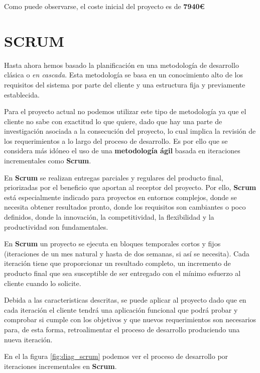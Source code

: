\bigskip
Como puede observarse, el coste inicial del proyecto es de \textbf{7940\euro}

\section{SCRUM}

Hasta ahora hemos basado la planificación en una metodología de desarrollo clásica o \textit{en cascada}. Esta metodología se basa en un conocimiento alto de los requisitos del sistema por parte del cliente y una estructura fija y previamente establecida. 

\bigskip
Para el proyecto actual no podemos utilizar este tipo de metodología ya que el cliente no sabe con exactitud lo que quiere, dado que hay una parte de investigación asociada a la consecución del proyecto, lo cual implica la revisión de los requerimientos a lo largo del proceso de desarrollo. Es por ello que se considera más idóneo el uso de una \textbf{metodología ágil} basada en iteraciones incrementales como \textbf{Scrum}.

\bigskip
En \textbf{Scrum} se realizan entregas parciales y regulares del producto final, priorizadas por el beneficio que aportan al receptor del proyecto. Por ello, \textbf{Scrum} está especialmente indicado para proyectos en entornos complejos, donde se necesita obtener resultados pronto, donde los requisitos son cambiantes o poco definidos, donde la innovación, la competitividad, la flexibilidad y la productividad son fundamentales.

\bigskip
En \textbf{Scrum} un proyecto se ejecuta en bloques temporales cortos y fijos (iteraciones de un mes natural y hasta de dos semanas, si así se necesita). Cada iteración tiene que proporcionar un resultado completo, un incremento de producto final que sea susceptible de ser entregado con el mínimo esfuerzo al cliente cuando lo solicite.

\bigskip
Debida a las caracteristicas descritas, se puede aplicar al proyecto dado que en cada iteración el cliente tendrá una aplicación funcional que podrá probar y comprobar si cumple con los objetivos y que nuevos requerimientos son necesarios para, de esta forma, retroalimentar el proceso de desarrollo produciendo una nueva iteración.

\bigskip
En el la figura \ref{fig:diag_scrum} podemos ver el proceso de desarrollo por iteraciones incrementales en \textbf{Scrum}.

